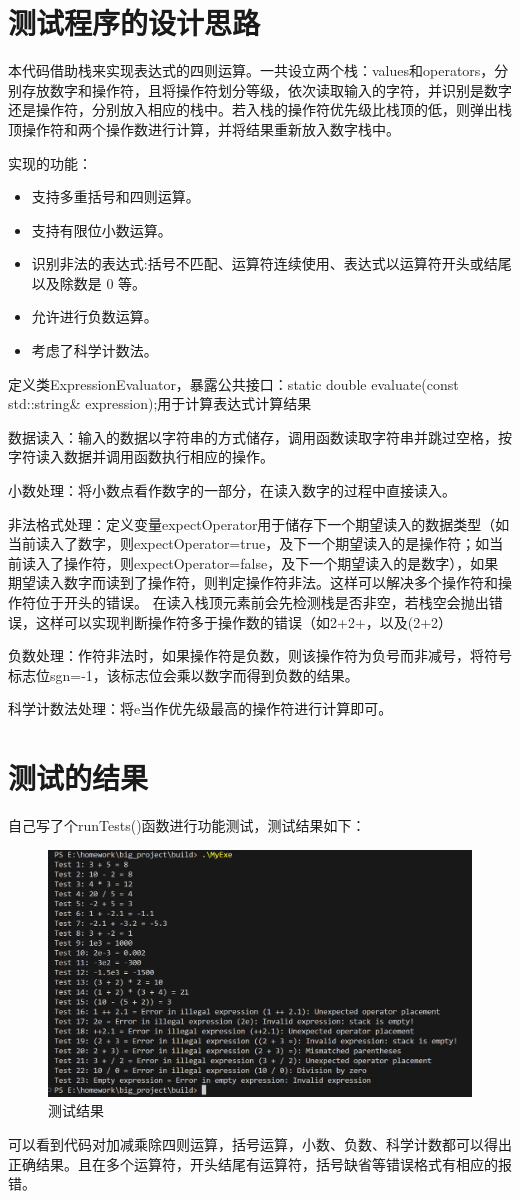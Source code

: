 \documentclass[UTF8]{ctexart}
\begin{document}
\pagestyle{fancy}
\fancyhead{}
\rhead{\today}

\section{测试程序的设计思路}

本代码借助栈来实现表达式的四则运算。一共设立两个栈：values和operators，分别存放数字和操作符，且将操作符划分等级，依次读取输入的字符，并识别是数字还是操作符，分别放入相应的栈中。若入栈的操作符优先级比栈顶的低，则弹出栈顶操作符和两个操作数进行计算，并将结果重新放入数字栈中。

实现的功能：
\begin{itemize}
    \item 支持多重括号和四则运算。
    \item 支持有限位小数运算。
    \item 识别非法的表达式:括号不匹配、运算符连续使用、表达式以运算符开头或结尾以及除数是 0 等。
    \item 允许进行负数运算。
    \item 考虑了科学计数法。
\end{itemize}

定义类ExpressionEvaluator，暴露公共接口：static double evaluate(const std::string& expression);用于计算表达式计算结果

数据读入：输入的数据以字符串的方式储存，调用函数读取字符串并跳过空格，按字符读入数据并调用函数执行相应的操作。

小数处理：将小数点看作数字的一部分，在读入数字的过程中直接读入。

非法格式处理：定义变量expectOperator用于储存下一个期望读入的数据类型（如当前读入了数字，则expectOperator=true，及下一个期望读入的是操作符；如当前读入了操作符，则expectOperator=false，及下一个期望读入的是数字），如果期望读入数字而读到了操作符，则判定操作符非法。这样可以解决多个操作符和操作符位于开头的错误。
在读入栈顶元素前会先检测栈是否非空，若栈空会抛出错误，这样可以实现判断操作符多于操作数的错误（如2+2+，以及(2+2）

负数处理：作符非法时，如果操作符是负数，则该操作符为负号而非减号，将符号标志位sgn=-1，该标志位会乘以数字而得到负数的结果。

科学计数法处理：将e当作优先级最高的操作符进行计算即可。

\section{测试的结果}

自己写了个runTests()函数进行功能测试，测试结果如下：

\begin{figure}[h]
    \centering
    \includegraphics[width=0.5\linewidth]{image.png}
    \caption{测试结果}
    \label{fig:enter-label}
\end{figure}


可以看到代码对加减乘除四则运算，括号运算，小数、负数、科学计数都可以得出正确结果。且在多个运算符，开头结尾有运算符，括号缺省等错误格式有相应的报错。
\end{document}
